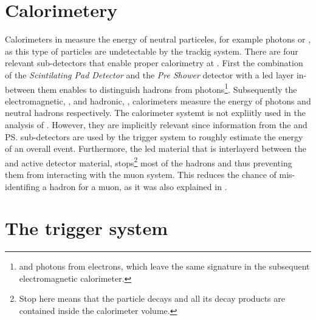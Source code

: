 \section{Calorimetery}
\label{det_calo}
Calorimeters in \lhcb measure the energy of neutral particeles, for example photons or \piz,
as this type of particles are undetectable by the trackig system. There are four relevant sub-detectors
that enable proper calorimetry at \lhcb. First the combination of the {\it Scintilating Pad Detector} \spd
and the {\it Pre Shower} detector with a led layer in-between them enables to distinguish hadrons from
photons\footnote{and photons from electrons, which leave the same signature in the subsequent electromagnetic calorimeter.}.
Subsequently the electromagnetic, \ecal, and hadronic, \hcal, calorimeters measure the energy of photons
and neutral hadrons respectively. The calorimeter systemt is not expliitly used in the analysis of .
However, they are implicitly relevant since information from the \spd and \ps sub-detectors are used
by the \lzero trigger system to roughly estimate the energy of an overall event. Furthermore, the
led material that is interlayerd between the \ecal and \hcal active detector material, stops\footnote{Stop here
means that the particle decays and all its decay products are contained inside the calorimeter volume.} most of
the hadrons and thus preventing them from interacting with the muon system. This reduces the chance
of mis-identifing a hadron for a muon, as it was also explained in .

\section{The trigger system}
\label{det_trigger}


%

